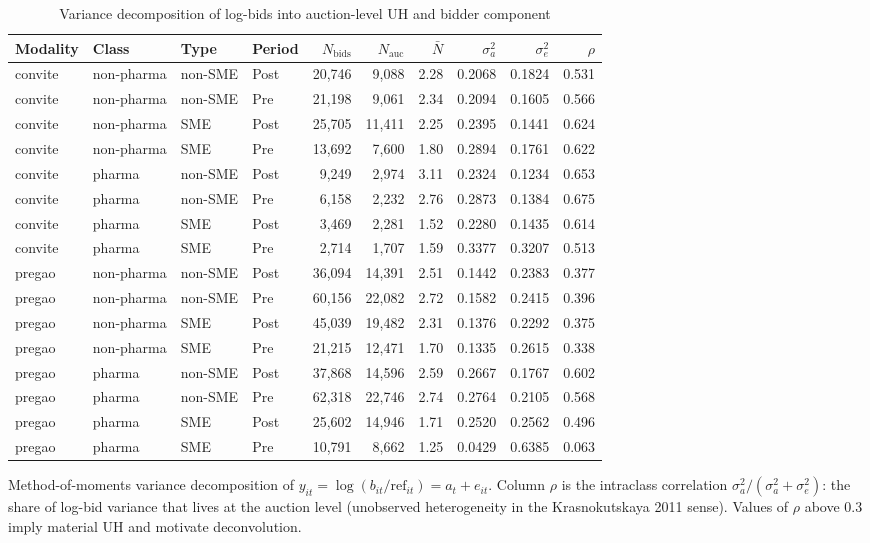 \begin{table}[htbp]
\centering
\begin{threeparttable}
\caption{Variance decomposition of log-bids into auction-level UH and bidder component}
\label{tab:v3_uh_variance}
\small
\begin{tabular}{llllrrrrrr}
\toprule
Modality & Class & Type & Period & $N_{\text{bids}}$ & $N_{\text{auc}}$ & $\bar{N}$ & $\sigma^2_a$ & $\sigma^2_e$ & $\rho$ \\
\midrule
convite & non-pharma & non-SME & Post & 20,746 & 9,088 & 2.28 & 0.2068 & 0.1824 & 0.531 \\
convite & non-pharma & non-SME & Pre & 21,198 & 9,061 & 2.34 & 0.2094 & 0.1605 & 0.566 \\
convite & non-pharma & SME & Post & 25,705 & 11,411 & 2.25 & 0.2395 & 0.1441 & 0.624 \\
convite & non-pharma & SME & Pre & 13,692 & 7,600 & 1.80 & 0.2894 & 0.1761 & 0.622 \\
convite & pharma & non-SME & Post & 9,249 & 2,974 & 3.11 & 0.2324 & 0.1234 & 0.653 \\
convite & pharma & non-SME & Pre & 6,158 & 2,232 & 2.76 & 0.2873 & 0.1384 & 0.675 \\
convite & pharma & SME & Post & 3,469 & 2,281 & 1.52 & 0.2280 & 0.1435 & 0.614 \\
convite & pharma & SME & Pre & 2,714 & 1,707 & 1.59 & 0.3377 & 0.3207 & 0.513 \\
pregao & non-pharma & non-SME & Post & 36,094 & 14,391 & 2.51 & 0.1442 & 0.2383 & 0.377 \\
pregao & non-pharma & non-SME & Pre & 60,156 & 22,082 & 2.72 & 0.1582 & 0.2415 & 0.396 \\
pregao & non-pharma & SME & Post & 45,039 & 19,482 & 2.31 & 0.1376 & 0.2292 & 0.375 \\
pregao & non-pharma & SME & Pre & 21,215 & 12,471 & 1.70 & 0.1335 & 0.2615 & 0.338 \\
pregao & pharma & non-SME & Post & 37,868 & 14,596 & 2.59 & 0.2667 & 0.1767 & 0.602 \\
pregao & pharma & non-SME & Pre & 62,318 & 22,746 & 2.74 & 0.2764 & 0.2105 & 0.568 \\
pregao & pharma & SME & Post & 25,602 & 14,946 & 1.71 & 0.2520 & 0.2562 & 0.496 \\
pregao & pharma & SME & Pre & 10,791 & 8,662 & 1.25 & 0.0429 & 0.6385 & 0.063 \\
\bottomrule
\end{tabular}
\begin{tablenotes}\footnotesize
\item Method-of-moments variance decomposition of $y_{it} =
\log(b_{it}/\text{ref}_{it}) = a_t + e_{it}$. Column $\rho$
is the intraclass correlation $\sigma^2_a / (\sigma^2_a +
\sigma^2_e)$: the share of log-bid variance that lives at the
auction level (unobserved heterogeneity in the Krasnokutskaya
2011 sense). Values of $\rho$ above 0.3 imply material UH and
motivate deconvolution.
\end{tablenotes}
\end{threeparttable}
\end{table}
